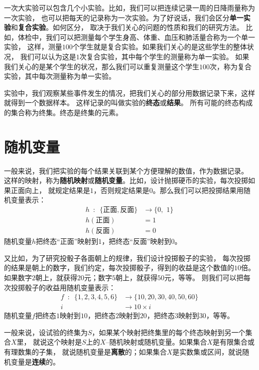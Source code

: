 \documentclass[12pt,UTF8,fontset=none]{ctexbook}
\begin{document}
一次大实验可以包含几个小实验。比如，我们可以把连续记录一周的日降雨量称为一次实验，
也可以把每天的记录称为一次实验。为了好说话，我们会区分\textbf{单一实验}和\textbf{复合实验}。如何区分，
取决于我们关心的问题的性质和我们的研究方法。
比如，体检中，我们可以把测量每个学生身高、体重、血压和肺活量合称为一个单一实验，
这样，测量$100$个学生就是复合实验。如果我们关心的是这些学生的整体状况，
我们可以认为这是$1$次复合实验，其中每个学生的测量称为单一实验。
如果我们关心的是某个学生的状况，那么我们可以重复测量这个学生$100$次，称为复合实验，其中每次测量称为单一实验。

实验中，我们观察某些事件发生的情况，把我们关心的部分用数据记录下来，这样就得到一个数据样本。
这样记录的叫做实验的\textbf{终态}或\textbf{结果}。
所有可能的终态构成的集合称为终集。终态是终集的元素。

\section{随机变量}

一般来说，我们把实验的每个结果关联到某个方便理解的数值，作为数据记录。
这样的映射，称为\textbf{随机映射}或\textbf{随机变量}。比如，设计抛掷硬币的实验，每次投掷如果正面向上，
就规定结果是$1$，否则规定结果是$0$。那么我们可以把投掷结果用随机变量表示：
\begin{align*}
    h \,\,\, : \,\,\, \{\mbox{正面}, \mbox{反面}\} &\rightarrow \{0,\,\, 1\}  \\
    h(\mbox{正面}) &= 1  \\
    h(\mbox{反面}) &= 0  
\end{align*}
随机变量$h$把终态“正面”映射到$1$，把终态“反面”映射到$0$。

又比如，为了研究投骰子各面朝上的规律，我们设计投掷骰子的实验，
每次投掷的结果是朝上的数字，我们约定，每次投掷骰子，得到的收益是这个数值的$10$倍。
如果数字$2$朝上，就获得$20$元；数字$5$朝上，就获得$50$元，等等。
则我们可以把每次投掷骰子的收益用随机变量表示：
\begin{align*}
f \,\,\, : \,\,\, \{1,2,3,4,5,6\} &\rightarrow \{10,20,30,40,50,60\}  \\
 i &\rightarrow 10\times i  
\end{align*}
随机变量$f$把终态$1$映射到$10$，把终态$2$映射到$20$，把终态$3$映射到$30$，等等。

一般来说，设试验的终集为$S$，如果某个映射把终集里的每个终态映射到另一个集合$X$里，
就说这个映射是$S$上的$X$–随机映射或随机变量。如果集合$X$是有限集合或有理数集的子集，
就说随机变量是\textbf{离散}的；如果集合$X$是实数集或区间，就说随机变量是\textbf{连续}的。
\end{document}
